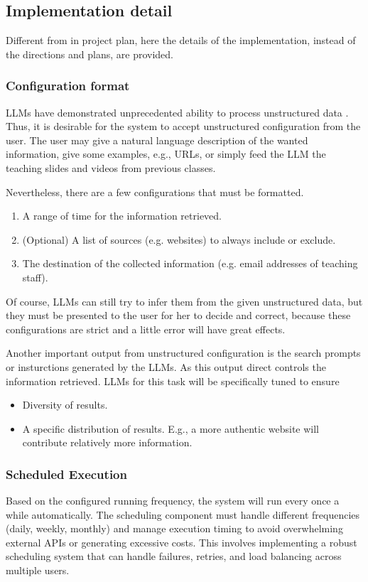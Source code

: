 \documentclass[final-report]{report-template}
\begin{document}
\subsection{Implementation detail}
Different from in project plan, here the details of the implementation, instead
of the directions and plans, are provided.

\subsubsection{Configuration format} 
LLMs have demonstrated unprecedented ability to process unstructured data
\cite{llm.unstructured.data.1, llm.unstructured.data.2}. Thus, it is desirable
for the system to accept unstructured configuration from the user. The user may
give a natural language description of the wanted information, give some
examples, e.g., URLs, or simply feed the LLM the teaching slides and videos
from previous classes.

Nevertheless, there are a few configurations that must be formatted.
\begin{enumerate}
	\item A range of time for the information retrieved.
	\item (Optional) A list of sources (e.g. websites) to always include or exclude.
	\item The destination of the collected information (e.g. email addresses of
		teaching staff).
\end{enumerate}
Of course, LLMs can still try to infer them from the given unstructured data,
but they must be presented to the user for her to decide and correct, because
these configurations are strict and a little error will have great effects.

Another important output from unstructured configuration is the search prompts
or insturctions generated by the LLMs. As this output direct controls the
information retrieved. LLMs for this task will be specifically tuned to ensure
\begin{itemize}
	\item Diversity of results.
	\item A specific distribution of results. E.g., a more authentic website
		will contribute relatively more information.
\end{itemize}

\subsubsection{Scheduled Execution} Based on the configured running frequency,
the system will run every once a while automatically. The scheduling component must handle
different frequencies (daily, weekly, monthly) and manage execution timing to
avoid overwhelming external APIs or generating excessive costs. This involves
implementing a robust scheduling system that can handle failures, retries, and
load balancing across multiple users.
\end{document}
